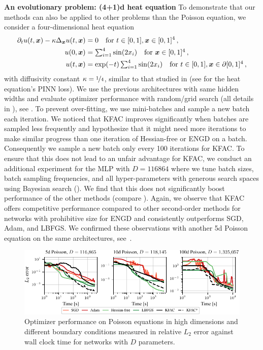 \textbf{An evolutionary problem: (4+1)d heat equation}
To demonstrate that our methods can also be applied to other problems than the Poisson equation, we consider a four-dimensional heat equation
\begin{align}\label{eq:4D-heat}
  \begin{split}
    \partial_t u(t,{\bm{x}})-\kappa\Delta_{\bm{x}} u(t,{\bm{x}})
    &=
      0 \quad \text{for } t\in[0,1], {\bm{x}}\in [0,1]^{4}\,,
    \\
    u(0,{\bm{x}})
    &=
      \textstyle
      \sum_{i=1}^{4} \sin(2 x_i) \quad \text{for }
      {\bm{x}}\in [0,1]^{4}\,,
    \\
    u(t,{\bm{x}})
    &=
      \textstyle
      \exp(-t) \sum_{i=1}^{4} \sin(2 x_i) \quad \text{for } t\in[0,1], {\bm{x}}\in\partial[0,1]^{4}\,,
  \end{split}
\end{align}
with diffusivity constant $\kappa = \nicefrac{1}{4}$, similar to that studied in \cite{muller2023achieving} (see  for the heat equation's PINN loss).
We use the previous architectures with same hidden widths and evaluate optimizer performance with random/grid search (all details in ), see .
To prevent over-fitting, we use mini-batches and sample a new batch each iteration.
We noticed that KFAC improves significantly when batches are sampled less frequently and hypothesize that it might need more iterations to make similar progress than one iteration of Hessian-free or ENGD on a batch.
Consequently we sample a new batch only every 100 iterations for KFAC.
To ensure that this does not lead to an unfair advantage for KFAC, we conduct an additional experiment for the MLP with $D=\num{116864}$ where we tune batch sizes, batch sampling frequencies, and all hyper-parameters with generous search spaces using Bayesian search ().
We find that this does not significantly boost performance of the other methods (compare ).
Again, we observe that KFAC offers competitive performance compared to other second-order methods for networks with prohibitive size for ENGD and consistently outperforms SGD, Adam, and LBFGS.
We confirmed these observations with another 5d Poisson equation on the same architectures, see~.

\begin{figure}
  \centering
  \includegraphics{../kfac_pinns_exp/exp33_poisson_bayes_groupplot/l2_error_over_time.pdf}
  \caption{
    Optimizer performance on Poisson equations in high dimensions and different boundary conditions measured in relative $L_2$ error against wall clock time for networks with $D$ parameters.
  }
  \label{fig:10D-Poisson}
\end{figure}

